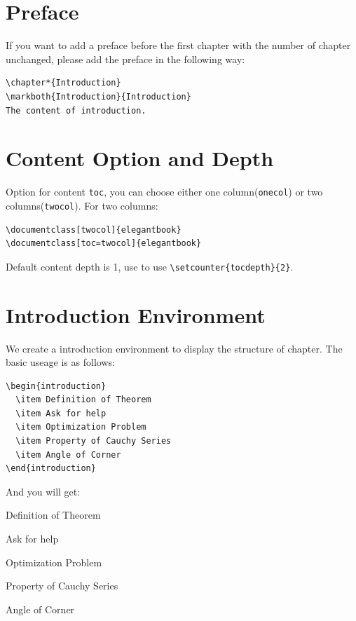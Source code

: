 \documentclass[11pt,bibend=bibtex]{elegantbook}
\begin{document}
\section{Preface}

If you want to add a preface before the first chapter with the number of chapter unchanged, please add the preface in the following way:
\begin{lstlisting}
\chapter*{Introduction}
\markboth{Introduction}{Introduction}
The content of introduction.
\end{lstlisting}

\section{Content Option and Depth}
Option for content \lstinline{toc}, you can  choose either one column(\lstinline{onecol}) or two columns(\lstinline{twocol}). For two columns:
\begin{lstlisting}
\documentclass[twocol]{elegantbook}
\documentclass[toc=twocol]{elegantbook}
\end{lstlisting}

Default content depth is 1, use to use \lstinline|\setcounter{tocdepth}{2}|.

\section{Introduction Environment}
We create a introduction environment to display the structure of chapter. The basic useage is as follows:
\begin{lstlisting}
\begin{introduction}
  \item Definition of Theorem
  \item Ask for help
  \item Optimization Problem
  \item Property of Cauchy Series
  \item Angle of Corner
\end{introduction}
\end{lstlisting}
And you will get:
\begin{introduction}
  \item Definition of Theorem
  \item Ask for help
  \item Optimization Problem
  \item Property of Cauchy Series
  \item Angle of Corner
\end{introduction}
\end{document}
